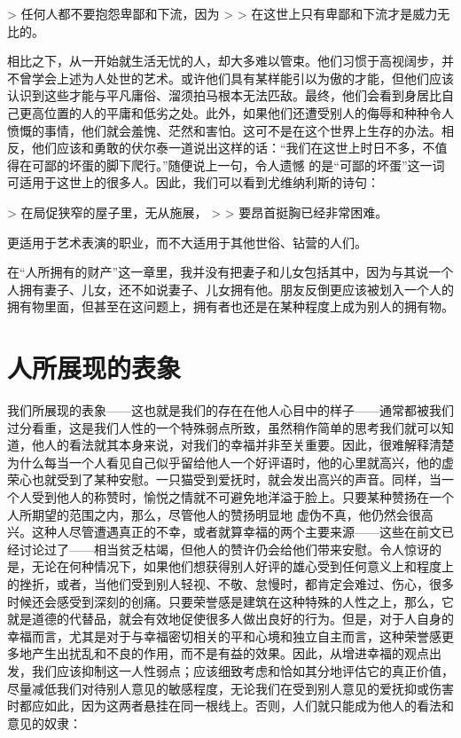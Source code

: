 \documentclass[12pt,oneside]{book}
\begin{document}
 

> 任何人都不要抱怨卑鄙和下流，因为 
>
> 在这世上只有卑鄙和下流才是威力无比的。 

 

相比之下，从一开始就生活无忧的人，却大多难以管束。他们习惯于高视阔步，并不曾学会上述为人处世的艺术。或许他们具有某样能引以为傲的才能，但他们应该认识到这些才能与平凡庸俗、溜须拍马根本无法匹敌。最终，他们会看到身居比自己更高位置的人的平庸和低劣之处。此外，如果他们还遭受别人的侮辱和种种令人愤慨的事情，他们就会羞愧、茫然和害怕。这可不是在这个世界上生存的办法。相反，他们应该和勇敢的伏尔泰一道说出这样的话：“我们在这世上时日不多，不值得在可鄙的坏蛋的脚下爬行。”随便说上一句，令人遗憾
的是“可鄙的坏蛋”这一词可适用于这世上的很多人。因此，我们可以看到尤维纳利斯的诗句：

 

> 在局促狭窄的屋子里，无从施展， 
>
> 要昂首挺胸已经非常困难。 

 

更适用于艺术表演的职业，而不大适用于其他世俗、钻营的人们。 

在“人所拥有的财产”这一章里，我并没有把妻子和儿女包括其中，因为与其说一个人拥有妻子、儿女，还不如说妻子、儿女拥有他。朋友反倒更应该被划入一个人的拥有物里面，但甚至在这问题上，拥有者也还是在某种程度上成为别人的拥有物。 

 

\chapter{人所展现的表象 }
我们所展现的表象——这也就是我们的存在在他人心目中的样子——通常都被我们过分看重，这是我们人性的一个特殊弱点所致，虽然稍作简单的思考我们就可以知道，他人的看法就其本身来说，对我们的幸福并非至关重要。因此，很难解释清楚为什么每当一个人看见自己似乎留给他人一个好评语时，他的心里就高兴，他的虚荣心也就受到了某种安慰。一只猫受到爱抚时，就会发出高兴的声音。同样，当一个人受到他人的称赞时，愉悦之情就不可避免地洋溢于脸上。只要某种赞扬在一个人所期望的范围之内，那么，尽管他人的赞扬明显地
虚伪不真，他仍然会很高兴。这种人尽管遭遇真正的不幸，或者就算幸福的两个主要来源——这些在前文已经讨论过了——相当贫乏枯竭，但他人的赞许仍会给他们带来安慰。令人惊讶的是，无论在何种情况下，如果他们想获得别人好评的雄心受到任何意义上和程度上的挫折，或者，当他们受到别人轻视、不敬、怠慢时，都肯定会难过、伤心，很多时候还会感受到深刻的创痛。只要荣誉感是建筑在这种特殊的人性之上，那么，它就是道德的代替品，就会有效地促使很多人做出良好的行为。但是，对于人自身的幸福而言，尤其是对于与幸福密切相关的平和心境和独立自主而言，这种荣誉感更多地产生出扰乱和不良的作用，而不是有益的效果。因此，从增进幸福的观点出发，我们应该抑制这一人性弱点；应该细致考虑和恰如其分地评估它的真正价值，尽量减低我们对待别人意见的敏感程度，无论我们在受到别人意见的爱抚抑或伤害时都应如此，因为这两者悬挂在同一根线上。否则，人们就只能成为他人的看法和意见的奴隶： 
\end{document}
